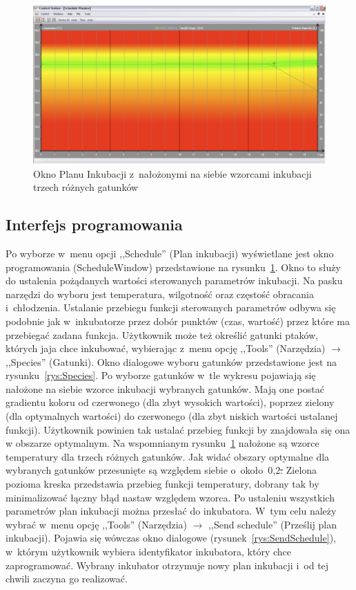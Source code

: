 \begin{figure}[p] 
\centering\includegraphics[width=\textwidth]{figures/Schedule}
\caption{Okno Planu Inkubacji z~nałożonymi na siebie wzorcami inkubacji trzech różnych gatunków}\label{rys:Schedule}
\end{figure}

\subsection{Interfejs programowania}
Po wyborze w~menu opcji ,,Schedule'' (Plan inkubacji) wyświetlane jest okno
programowania (ScheduleWindow) przedstawione na rysunku~\ref{rys:Schedule}. Okno
to służy do ustalenia pożądanych wartości sterowanych parametrów inkubacji. Na
pasku narzędzi do wyboru jest temperatura, wilgotność oraz częstość obracania
i~chłodzenia. Ustalanie przebiegu funkcji sterowanych parametrów odbywa się
podobnie jak w~inkubatorze przez dobór punktów (czas, wartość) przez które ma
przebiegać zadana funkcja. Użytkownik może też określić gatunki ptaków, których
jaja chce inkubować, wybierając z~menu opcję ,,Tools'' (Narzędzia) $\rightarrow$
,,Species'' (Gatunki). Okno dialogowe wyboru gatunków przedstawione jest na
rysunku~\ref{rys:Species}. Po wyborze gatunków w~tle wykresu pojawiają się
nałożone na siebie wzorce inkubacji wybranych gatunków. Mają one postać
gradientu koloru od czerwonego (dla zbyt wysokich wartości), poprzez zielony
(dla optymalnych wartości) do czerwonego (dla zbyt niskich wartości ustalanej
funkcji). Użytkownik powinien tak ustalać przebieg funkcji by znajdowała się ona
w obszarze optymalnym. Na wspomnianym rysunku~\ref{rys:Schedule} nałożone są
wzorce temperatury dla trzech różnych gatunków. Jak widać obszary optymalne dla
wybranych gatunków przesunięte są względem siebie o~około~0,2\st. Zielona
pozioma kreska przedstawia przebieg funkcji temperatury, dobrany tak by
minimalizować łączny błąd nastaw względem wzorca. Po ustaleniu wszystkich
parametrów plan inkubacji można przesłać do inkubatora. W~tym celu należy wybrać
w~menu opcję ,,Tools'' (Narzędzia) $\rightarrow$ ,,Send schedule'' (Prześlij
plan inkubacji). Pojawia się wówczas okno dialogowe
(rysunek~\ref{rys:SendSchedule}), w~którym użytkownik wybiera identyfikator
inkubatora, który chce zaprogramować. Wybrany inkubator otrzymuje nowy plan
inkubacji i~od tej chwili zaczyna go realizować.

